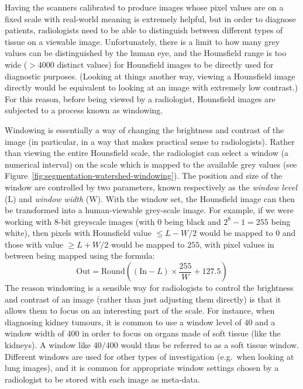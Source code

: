 Having the scanners calibrated to produce images whose pixel values are on a fixed scale with real-world meaning is extremely helpful, but in order to diagnose patients, radiologists need to be able to distinguish between different types of tissue on a viewable image. Unfortunately, there is a limit to how many grey values can be distinguished by the human eye, and the Hounsfield range is too wide ($> 4000$ distinct values) for Hounsfield images to be directly used for diagnostic purposes. (Looking at things another way, viewing a Hounsfield image directly would be equivalent to looking at an image with extremely low contrast.) For this reason, before being viewed by a radiologist, Hounsfield images are subjected to a process known as windowing.

Windowing is essentially a way of changing the brightness and contrast of the image (in particular, in a way that makes practical sense to radiologists). Rather than viewing the entire Hounsfield scale, the radiologist can select a window (a numerical interval) on the scale which is mapped to the available grey values (see Figure~\ref{fig:segmentation-watershed-windowing}). The position and size of the window are controlled by two parameters, known respectively as the \emph{window level} (L) and \emph{window width} (W). With the window set, the Hounsfield image can then be transformed into a human-viewable grey-scale image. For example, if we were working with 8-bit greyscale images (with $0$ being black and $2^8 - 1 = 255$ being white), then pixels with Hounsfield value $\le L - W/2$ would be mapped to $0$ and those with value $\ge L + W/2$ would be mapped to $255$, with pixel values in between being mapped using the formula:
%
\[
\mbox{Out} = \mbox{Round}\left( (\mbox{In} - L) \times \frac{255}{W} + 127.5 \right)
\]
%
The reason windowing is a sensible way for radiologists to control the brightness and contrast of an image (rather than just adjusting them directly) is that it allows them to focus on an interesting part of the scale. For instance, when diagnosing kidney tumours, it is common to use a window level of $40$ and a window width of $400$ in order to focus on organs made of soft tissue (like the kidneys). A window like $40/400$ would thus be referred to as a soft tissue window. Different windows are used for other types of investigation (e.g.~when looking at lung images), and it is common for appropriate window settings chosen by a radiologist to be stored with each image as meta-data.

